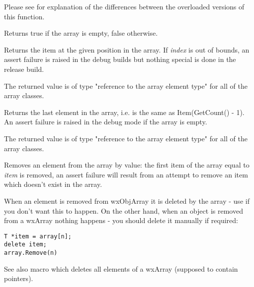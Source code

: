 Please see  for explanation of the differences
between the overloaded versions of this function.

\label{wxarrayisempty}


Returns true if the array is empty, false otherwise.

\label{wxarrayitem}


Returns the item at the given position in the array. If {\it index} is out of
bounds, an assert failure is raised in the debug builds but nothing special is
done in the release build.

The returned value is of type "reference to the array element type" for all of
the array classes.

\label{wxarraylast}


Returns the last element in the array, i.e. is the same as Item(GetCount() - 1).
An assert failure is raised in the debug mode if the array is empty.

The returned value is of type "reference to the array element type" for all of
the array classes.

\label{wxarrayremove}


Removes an element from the array by value: the first item of the
array equal to {\it item} is removed, an assert failure will result from an
attempt to remove an item which doesn't exist in the array.

When an element is removed from wxObjArray it is deleted by the array - use 
 if you don't want this to happen. On the
other hand, when an object is removed from a wxArray nothing happens - you
should delete it manually if required:

\begin{verbatim}
T *item = array[n];
delete item;
array.Remove(n)
\end{verbatim}

See also  macro which deletes all
elements of a wxArray (supposed to contain pointers).

\label{wxarrayremoveat}

